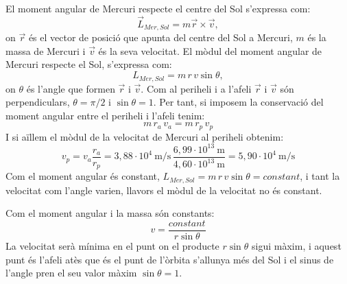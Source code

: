 \begin{solapartat}

El moment angular de Mercuri respecte el centre del Sol s'expressa com:
\[ \vec{L}_{Mer,Sol} = m\vec{r}\times\vec{v}, \]
on $\vec{r}$ és el vector de posició que apunta del centre del Sol a Mercuri, $m$ és la massa de Mercuri i $\vec{v}$ és la seva velocitat. El mòdul del moment angular de Mercuri respecte el Sol, s'expressa com:
\[ L_{Mer,Sol} = m\,r\,v\sin\theta, \]
on $\theta$ és l'angle que formen $\vec{r}$ i $\vec{v}$. Com al periheli i a l'afeli $\vec{r}$ i $\vec{v}$ són perpendiculars, $\theta = \pi/2$ i $\sin\theta = 1$. Per tant, si imposem la conservació del moment angular entre el periheli i l'afeli tenim:
\[ m\,r_a\,v_a = m\,r_p\,v_p \]
I si aïllem el mòdul de la velocitat de Mercuri al periheli obtenim:
\[ v_p = v_a\frac{r_a}{r_p} = 3,88\cdot 10^{4}\ \mathrm{m/s}\,\frac{6,99\cdot 10^{13}\ \mathrm{m}}{4,60\cdot 10^{13}\ \mathrm{m}} = 5,90\cdot 10^{4}\ \mathrm{m/s} \]
Com el moment angular és constant, $L_{Mer,Sol} = m\,r\,v\sin\theta = \mathit{constant}$, i tant la velocitat com l'angle varien, llavors el mòdul de la velocitat no és constant.

Com el moment angular i la massa són constants:
\[ v = \frac{\mathit{constant}}{r\sin\theta} \]
La velocitat serà mínima en el punt on el producte $r\sin\theta$ sigui màxim, i aquest punt és l'afeli atès que és el punt de l'òrbita s'allunya més del Sol i el sinus de l'angle pren el seu valor màxim $\sin\theta = 1$.
\end{solapartat}
